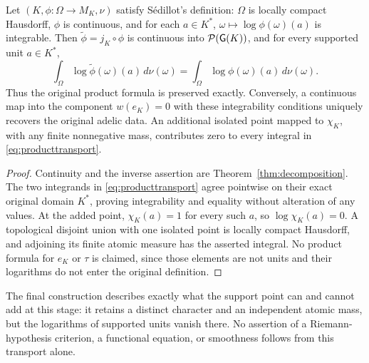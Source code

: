 \begin{proposition}
\label{prop:adelictransport}
Let $(K,\phi:\Omega\to M_K,\nu)$ satisfy S\'edillot's definition:
$\Omega$ is locally compact Hausdorff, $\phi$ is continuous, and for
each $a\in K^*$, $\omega\mapsto\log\phi(\omega)(a)$ is integrable.
Then $\widetilde\phi=j_K\circ\phi$ is continuous into
$\mathcal P(\mathsf G(K))$, and for every supported unit $a\in K^*$,
\[
 \int_\Omega\log\widetilde\phi(\omega)(a)\,d\nu(\omega)
 =\int_\Omega\log\phi(\omega)(a)\,d\nu(\omega).
 \tag{AV8.1}\label{eq:producttransport}
\]
Thus the original product formula is preserved exactly. Conversely,
a continuous map into the component $w(e_K)=0$ with these integrability
conditions uniquely recovers the original adelic data. An additional
isolated point mapped to $\chi_K$, with any finite nonnegative mass,
contributes zero to every integral in \eqref{eq:producttransport}.
\end{proposition}
\begin{proof}
Continuity and the inverse assertion are
Theorem~\ref{thm:decomposition}. The two integrands in
\eqref{eq:producttransport} agree pointwise on their exact original
domain $K^*$, proving integrability and equality without alteration of
any values. At the added point, $\chi_K(a)=1$ for every such $a$, so
$\log\chi_K(a)=0$. A topological disjoint union with one isolated point
is locally compact Hausdorff, and adjoining its finite atomic measure
has the asserted integral. No product formula for $e_K$ or $\tau$ is
claimed, since those elements are not units and their logarithms do
not enter the original definition.
\end{proof}

The final construction describes exactly what the support point can
and cannot add at this stage: it retains a distinct character and an
independent atomic mass, but the logarithms of supported units vanish
there. No assertion of a Riemann-hypothesis criterion, a functional
equation, or smoothness follows from this transport alone.

